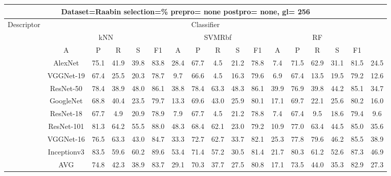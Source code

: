 \documentclass[12pt,italian]{article}
\begin{document}
\begin{tiny}
\begin{longtable}{lcccccccccccccccc}
\toprule
\multicolumn{16}{c}{Dataset=Raabin selection=\% prepro= none postpro= none, gl= 256} \\ 
\toprule
Descriptor & \multicolumn{15}{c}{Classifier} \\ 
& \multicolumn{5}{c}{kNN} & \multicolumn{5}{c}{SVMRbf} & \multicolumn{5}{c}{RF} \\ 
& A & P & R & S & F1 & A & P & R & S & F1 & A & P & R & S & F1 \\ 
\midrule
& AlexNet & 75.1 & 41.9 & 39.8 & 83.8 & 28.4 & 67.7 &  4.5 & 21.2 & 78.8 &  7.4 & 71.5 & 62.9 & 31.1 & 81.5 & 24.5 \\ 
& VGGNet-19 & 67.4 & 25.5 & 20.3 & 78.7 &  9.7 & 66.6 &  4.5 & 16.3 & 79.6 &  6.9 & 67.4 & 13.5 & 19.5 & 79.2 & 12.6 \\ 
& ResNet-50 & 78.4 & 38.9 & 48.0 & 86.1 & 38.8 & 78.4 & 63.3 & 48.3 & 86.1 & 39.9 & 76.9 & 39.8 & 44.2 & 85.1 & 34.7 \\ 
& GoogleNet & 68.8 & 40.4 & 23.5 & 79.7 & 13.3 & 69.6 & 43.0 & 25.9 & 80.1 & 17.1 & 69.7 & 22.1 & 25.6 & 80.2 & 16.0 \\ 
& ResNet-18 & 67.7 &  4.9 & 20.9 & 78.9 &  7.9 & 67.7 &  4.5 & 21.2 & 78.8 &  7.4 & 67.4 &  9.5 & 18.6 & 79.4 &  9.6 \\ 
& ResNet-101 & 81.3 & 64.2 & 55.5 & 88.0 & 48.3 & 68.4 & 62.1 & 23.0 & 79.2 & 10.9 & 77.0 & 63.4 & 44.5 & 85.0 & 35.6 \\ 
& VGGNet-16 & 76.5 & 63.3 & 43.0 & 84.7 & 33.3 & 72.7 & 62.7 & 33.7 & 82.1 & 25.3 & 77.8 & 79.6 & 46.2 & 85.5 & 38.9 \\ 
& Inceptionv3 & 83.5 & 59.6 & 60.2 & 89.6 & 53.4 & 71.4 & 57.2 & 30.5 & 81.4 & 21.7 & 80.3 & 61.2 & 52.6 & 87.3 & 46.9 \\ 
\hline
& AVG & 74.8 & 42.3 & 38.9 & 83.7 & 29.1 & 70.3 & 37.7 & 27.5 & 80.8 & 17.1 & 73.5 & 44.0 & 35.3 & 82.9 & 27.3 \\ 
\hline
\bottomrule
\end{longtable} 

 \pagebreak 
\end{tiny} 
 
\end{document}
